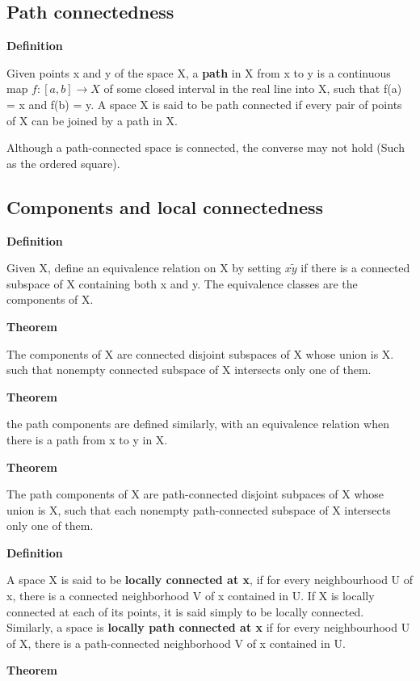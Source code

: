 \documentclass[11pt]{article}
\begin{document}
\subsection{Path connectedness}
\label{sec:org31a079d}

\textbf{Definition}

Given points x and y of the space X, a \textbf{path} in X from x to y is a continuous map \(f : [a,b] \to X\) of some closed interval in the real line into X, such that f(a) = x and f(b) = y. A space X is said to be path connected if every pair of points of X can be joined by a path in X.


Although a path-connected space is connected, the converse may not hold (Such as the ordered square).

\subsection{Components and local connectedness}
\label{sec:org9c6c117}

\textbf{Definition}

Given X, define an equivalence relation on X by setting \(x \tilde y\) if there is a connected subspace of X containing both x and y. The equivalence classes are the components of X.

\textbf{Theorem}

The components of X are connected disjoint subspaces of X whose union is X. such that nonempty connected subspace of X intersects only one of them.

\textbf{Theorem}

the path components are defined similarly, with an equivalence relation when there is a path from x to y in X.

\textbf{Theorem}

The path components of X are path-connected disjoint subpaces of X whose union is X, such that each nonempty path-connected subspace of X intersects only one of them.


\textbf{Definition}

A space X is said to be \textbf{locally connected at x}, if for every neighbourhood U of x, there is a connected neighborhood V of x contained in U. If X is locally connected at each of its points, it is said simply to be locally connected. Similarly, a space is \textbf{locally path connected at x} if for every neighbourhood U of X, there is a path-connected neighborhood V of x contained in U.

\textbf{Theorem}
\end{document}
